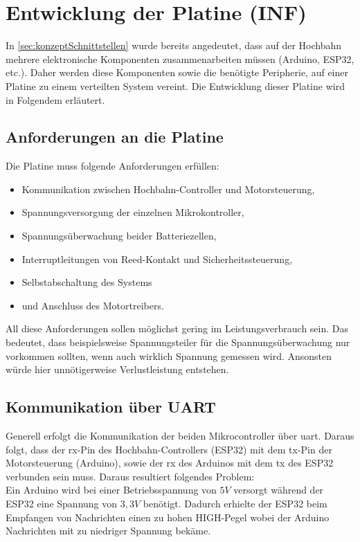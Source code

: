 \chapter{Entwicklung der Platine (INF)}
\label{sec:ecardConcept}
In \autoref{sec:konzeptSchnittstellen} wurde bereits angedeutet, dass auf der Hochbahn mehrere elektronische Komponenten zusammenarbeiten müssen (Arduino, ESP32, etc.). Daher werden diese Komponenten sowie die benötigte Peripherie, auf einer Platine zu einem verteilten System vereint. 
Die Entwicklung dieser Platine wird in Folgendem erläutert.

\section{Anforderungen an die Platine}
Die Platine muss folgende Anforderungen erfüllen: 
\begin{center}
	\begin{itemize}
		\item Kommunikation zwischen Hochbahn-Controller und Motorsteuerung,
		\item Spannungsversorgung der einzelnen Mikrokontroller,
		\item Spannungsüberwachung beider Batteriezellen,
		\item Interruptleitungen von Reed-Kontakt und Sicherheitssteuerung,
		\item Selbstabschaltung des Systems
		\item und Anschluss des Motortreibers.
	\end{itemize}
\end{center}
All diese Anforderungen sollen möglichst gering im Leistungsverbrauch sein. Das bedeutet, dass beispielsweise Spannungsteiler für die Spannungsüberwachung nur vorkommen sollten, wenn auch wirklich Spannung gemessen wird. Ansonsten würde hier unnötigerweise Verlustleistung entstehen. 

\section{Kommunikation über UART}
Generell erfolgt die Kommunikation der beiden Mikrocontroller über \acrshort{uart}. Daraus folgt, dass der \acrfull{rx}-Pin des Hochbahn-Controllers (ESP32) mit dem \acrfull{tx}-Pin der Motorsteuerung (Arduino), sowie der \acrshort{rx} des Arduinos mit dem \acrshort{tx} des ESP32 verbunden sein muss. 
Daraus resultiert folgendes Problem: \\
Ein Arduino wird bei einer Betriebsspannung von $5V$ versorgt während der ESP32 eine Spannung von $3,3V$ benötigt. Dadurch erhielte der ESP32 beim Empfangen von Nachrichten einen zu hohen HIGH-Pegel wobei der Arduino Nachrichten mit zu niedriger Spannung bekäme.

